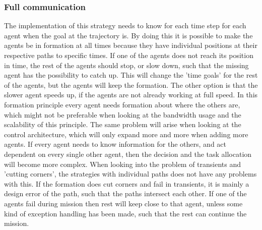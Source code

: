 \subsubsection{Full communication}
The implementation of this strategy needs to know for each time step for each agent when the goal at the trajectory is. By doing this it is possible to make the agents be in formation at all times because they have individual positions at their respective paths to specific times. If one of the agents does not reach its position in time, the rest of the agents should stop, or slow down, such that the missing agent has the possibility to catch up. This will change the 'time goals' for the rest of the agents, but the agents will keep the formation. The other option is that the slower agent speeds up, if the agents are not already working at full speed. In this formation principle every agent needs formation about where the others are, which might not be preferable when looking at the bandwidth usage and the scalability of this principle. The same problem will arise when looking at the control architecture, which will only expand more and more when adding more agents. If every agent needs to know information for the others, and act dependent on every single other agent, then the decision and the task allocation will become more complex. When looking into the problem of transients and 'cutting corners', the strategies with individual paths does not have any problems with this. If the formation does cut corners and fail in transients, it is mainly a design error of the path, such that the paths intersect each other. If one of the agents fail during mission then rest will keep close to that agent, unless some kind of exception handling has been made, such that the rest can continue the mission.

